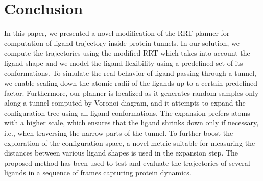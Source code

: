 \documentclass[usletter, 10pt, conference]{ieeeconf} %
\def\dt{d_{tunnel}}
\def\RI{R_{init}}
\def\rv{R_{tunnel}}
\begin{document}



\section{Conclusion}

In this paper, we presented a novel modification of the RRT planner for computation of ligand trajectory inside protein tunnels.
In our solution, we compute the trajectories using the modified RRT which takes into account the ligand shape and we model the ligand flexibility using a predefined set of its conformations.
To simulate the real behavior of ligand passing through a tunnel, we enable scaling down the atomic radii of the ligands up to a certain predefined factor.
Furthermore, our planner is localized as it generates random samples only along a tunnel computed by Voronoi diagram, and it attempts to expand the configuration
tree using all ligand conformations. 
The expansion prefers atoms with a higher scale, which ensures that the ligand shrinks down only if necessary, i.e., when traversing the narrow parts of the tunnel.
To further boost the exploration of the configuration space, a novel metric suitable for measuring the distances between various ligand shapes is used in the expansion step.
The proposed method has been used to test and evaluate the trajectories of several ligands in a sequence of frames capturing protein dynamics.



\end{document}
